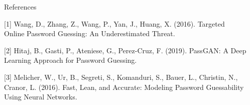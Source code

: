 \documentclass[final]{beamer}
\newlength{\sepwidth}
\newlength{\colwidth}
\newcommand{\separatorcolumn}{\begin{column}{\sepwidth}\end{column}}
\begin{document}
\begin{frame}[t]
\begin{columns}[t]
\begin{column}{\colwidth}
\begin{block}{References}
{\small
    [1] Wang, D., Zhang, Z., Wang, P., Yan, J., Huang, X. (2016). Targeted Online Password Guessing: An Underestimated Threat.
    
    [2] Hitaj, B., Gasti, P., Ateniese, G.,  Perez-Cruz, F. (2019). PassGAN: A Deep Learning Approach for Password Guessing.
    
    [3] Melicher, W., Ur, B., Segreti, S., Komanduri, S., Bauer, L., Christin, N.,  Cranor, L. (2016). Fast, Lean, and Accurate: Modeling Password Guessability Using Neural Networks.
}
  \end{block}

\end{column}

\separatorcolumn
\end{columns}
\end{frame}
\end{document}
